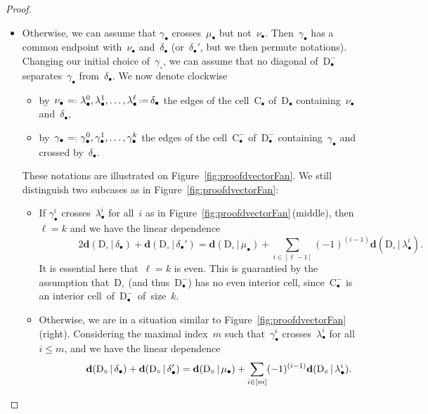\documentclass{amsart}
\theoremstyle{definition}
\newcommand{\eqdef}{\mbox{\,\raisebox{0.2ex}{\scriptsize\ensuremath{\mathrm:}}\ensuremath{=}\,}} %
\newcommand{\defeq}{\mbox{~\ensuremath{=}\raisebox{0.2ex}{\scriptsize\ensuremath{\mathrm:}} }} %
\newcommand{\fref}[1]{Figure~\ref{#1}} %
\newcommand{\dissection}{\mathrm{D}} %
\newcommand{\cell}{\mathrm{C}} %
\newcommand{\dvector}[2]{\mathbf{d}(#1 \,|\, #2)} %
\newcommand{\mi}{-} %
\begin{document}
\begin{proof}
\begin{itemize}
\item Otherwise, we can assume that $\gamma_\bullet$ crosses~$\mu_\bullet$ but not~$\nu_\bullet$. Then~$\gamma_\bullet$ has a common endpoint with~$\nu_\bullet$ and~$\delta_\bullet$ (or~$\delta_\bullet'$, but we then permute notations). Changing our initial choice of~$\gamma_\circ$, we can assume that no diagonal of~$\dissection_\bullet^\mi$ separates~$\gamma_\bullet$ from~$\delta_\bullet$. We now denote clockwise 
    \begin{itemize}
    \item by~$\nu_\bullet \defeq \lambda_\bullet^0, \lambda_\bullet^1, \dots, \lambda_\bullet^\ell \eqdef \delta_\bullet$ the edges of the cell~$\cell_\bullet$ of~$\dissection_\bullet$ containing~$\nu_\bullet$ and~$\delta_\bullet$,
    \item by~$\gamma_\bullet \defeq \gamma_\bullet^0, \gamma_\bullet^1, \dots, \gamma_\bullet^k$ the edges of the cell~$\cell_\bullet^\mi$ of~$\dissection_\bullet^\mi$ containing~$\gamma_\bullet$ and crossed by~$\delta_\bullet$.
    \end{itemize}
These notations are illustrated on \fref{fig:proofdvectorFan}. We still distinguish two subcases as in \fref{fig:proofdvectorFan}:
	\begin{itemize}
	\item If $\gamma_\bullet^i$ crosses~$\lambda_\bullet^i$ for all~$i$ as in \fref{fig:proofdvectorFan}\,(middle), then~$\ell = k$ and we have the linear dependence
	\[
	\qquad\qquad 2\dvector{\dissection_\circ}{\delta_\bullet} + \dvector{\dissection_\circ}{\delta_\bullet'} = \dvector{\dissection_\circ}{\mu_\bullet} + \sum_{i \in [\ell-1]} (-1)^{(i-1)}\dvector{\dissection_\circ}{\lambda_\bullet^i}.
	\]
	It is essential here that~$\ell = k$ is even. This is guarantied by the assumption that~$\dissection_\circ$ (and thus~$\dissection_\bullet^\mi$) has no even interior cell, since~$\cell_\bullet^\mi$ is an interior \mbox{cell of~$\dissection_\bullet^\mi$ of size $k$}.
	\item Otherwise, we are in a situation similar to \fref{fig:proofdvectorFan}\,(right). Considering the maximal index~$m$ such that~$\gamma_\bullet^i$ crosses~$\lambda_\bullet^i$ for all~$i \le m$, and we have the linear dependence
	\[
	\qquad\qquad \dvector{\dissection_\circ}{\delta_\bullet} + \dvector{\dissection_\circ}{\delta_\bullet'} = \dvector{\dissection_\circ}{\mu_\bullet} + \sum_{i \in [m]} (-1)^{(i-1)} \dvector{\dissection_\circ}{\lambda_\bullet^i}. \qedhere
	\]
	\end{itemize}
\end{itemize}

\end{proof}
\end{document}
